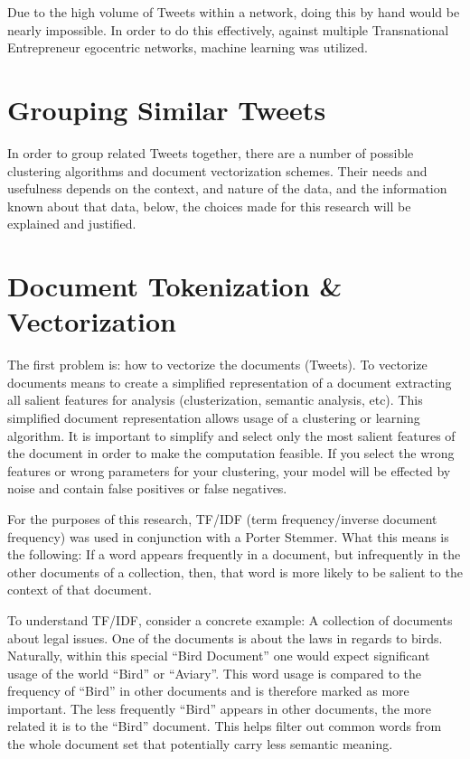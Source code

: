 Due to the high volume of Tweets within a network, doing this by hand
would be nearly impossible. In order to do this effectively, against
multiple Transnational Entrepreneur egocentric networks, machine
learning was utilized.

\section{Grouping Similar Tweets}
In order to group related Tweets together, there are a number of
possible clustering algorithms and document vectorization
schemes. Their needs and usefulness depends on the context, and nature
of the data, and the information known about that data, below, the
choices made for this research will be explained and justified.

\section{Document Tokenization \& Vectorization}
The first problem is: how to vectorize the documents (Tweets). To
vectorize documents means to create a simplified representation of a
document extracting all salient features for analysis (clusterization,
semantic analysis, etc). This simplified document representation
allows usage of a clustering or learning algorithm. It is important to
simplify and select only the most salient features of the document in
order to make the computation feasible. If you select the wrong
features or wrong parameters for your clustering, your model will be
effected by noise and contain false positives or false negatives.

For the purposes of this research, TF/IDF (term frequency/inverse
document frequency) was used in conjunction with a Porter
Stemmer. What this means is the following: If a word appears
frequently in a document, but infrequently in the other documents of a
collection, then, that word is more likely to be salient to the
context of that document.

To understand TF/IDF, consider a concrete example: A collection of
documents about legal issues. One of the documents is about the laws
in regards to birds. Naturally, within this special ``Bird Document''
one would expect significant usage of the world ``Bird'' or
``Aviary''. This word usage is compared to the frequency of ``Bird''
in other documents and is therefore marked as more important. The less
frequently ``Bird'' appears in other documents, the more related it is
to the ``Bird'' document. This helps filter out common words from the
whole document set that potentially carry less semantic meaning.

